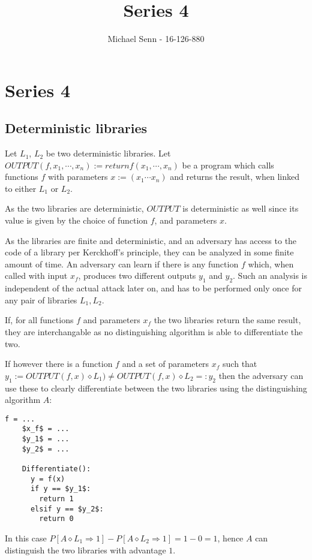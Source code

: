 \documentclass[a4paper]{scrreprt}
\title{Series 4}
\author{Michael Senn \maillink{michael.senn@students.unibe.ch} - 16-126-880}
\date{\printdate}
\begin{document}
\maketitle


\setcounter{chapter}{3}
\chapter{Series 4}

\section{Deterministic libraries}

Let $L_1$, $L_2$ be two deterministic libraries. Let $OUTPUT(f, x_1, \cdots,
x_n) := return f(x_1, \cdots, x_n)$ be a program which calls functions $f$ with
parameters $x := (x_1 \cdots x_n)$ and returns the result, when linked to
either $L_1$ or $L_2$.

As the two libraries are deterministic, $OUTPUT$ is deterministic as well since
its value is given by the choice of function $f$, and parameters $x$.

As the libraries are finite and deterministic, and an adversary has access to
the code of a library per Kerckhoff's principle, they can be analyzed in some
finite amount of time. An adversary can learn if there is any function $f$
which, when called with input $x_f$, produces two different outputs $y_1$ and
$y_2$. Such an analysis is independent of the actual attack later on, and has
to be performed only once for any pair of libraries $L_1, L_2$.

If, for all functions $f$ and parameters $x_f$ the two libraries return the
same result, they are interchangable as no distinguishing algorithm is able to
differentiate the two.

If however there is a function $f$ and a set of parameters $x_f$ such that $y_1
:= OUTPUT(f, x) \diamond L_1) \neq OUTPUT(f, x) \diamond L_2 =: y_2$ then the
adversary can use these to clearly differentiate between the two libraries
using the distinguishing algorithm $A$:

\begin{lstlisting}[mathescape=true, frame=single]
	f = ...
	$x_f$ = ...
	$y_1$ = ...
	$y_2$ = ...

	Differentiate():
	  y = f(x)
	  if y == $y_1$:
	    return 1
	  elsif y == $y_2$:
	    return 0
\end{lstlisting}

In this case $P[A \diamond L_1 \Rightarrow 1] - P[A \diamond L_2 \Rightarrow 1]
= 1 - 0 = 1$, hence $A$ can distinguish the two libraries with advantage $1$.
\end{document}
